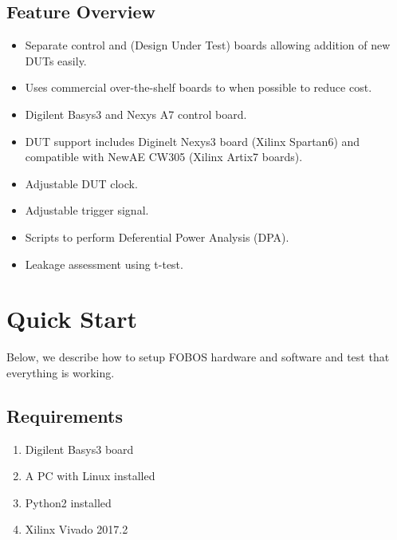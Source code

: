 \documentclass[letterpaper,10pt,english]{sphinxmanual}
\begin{document}
\section{Feature Overview}
\label{\detokenize{introduction:feature-overview}}\begin{itemize}
\item {} 
Separate control and (Design Under Test) boards allowing addition of new DUTs easily.

\item {} 
Uses commercial over-the-shelf boards to when possible to reduce cost.

\item {} 
Digilent Basys3 and Nexys A7 control board.

\item {} 
DUT support includes Diginelt Nexys3 board (Xilinx Spartan6) and compatible with NewAE CW305
(Xilinx Artix7 boards).

\item {} 
Adjustable DUT clock.

\item {} 
Adjustable trigger signal.

\item {} 
Scripts to perform Deferential Power Analysis (DPA).

\item {} 
Leakage assessment using t-test.

\end{itemize}


\chapter{Quick Start}
\label{\detokenize{quickstart:quick-start}}\label{\detokenize{quickstart::doc}}
Below, we describe how to setup FOBOS hardware and software and test that everything is working.


\section{Requirements}
\label{\detokenize{quickstart:requirements}}\begin{enumerate}
%
\item {} 
Digilent Basys3 board

\item {} 
A PC with Linux installed

\item {} 
Python2 installed

\item {} 
Xilinx Vivado 2017.2

\end{enumerate}
\end{document}
